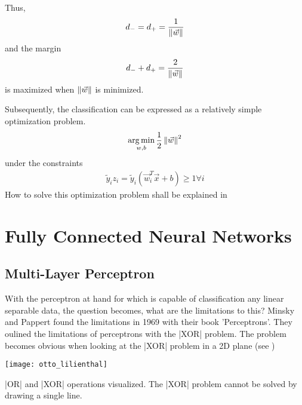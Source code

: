 Thus,
\begin{align}
    d_- = d_+ = \frac{1}{\left\lVert\vec{w}\right\rVert}
\end{align}
and the margin
\begin{align}
    d_- + d_+ = \frac{2}{\left\lVert\vec{w}\right\rVert}
\end{align}
is maximized when $\left\lVert\vec{w}\right\rVert$ is minimized.

Subsequently, the classification can be expressed as a relatively simple optimization problem.
\begin{align}
    \operatorname*{arg\,min}_{w, b} \frac{1}{2} \left\lVert\vec{w}\right\rVert^2
\end{align}
under the constraints
\begin{align}
    \tilde{y}_i z_i = \tilde{y}_i (\vec{w}_i^T \vec{x} + b) \geq 1 \forall i
\end{align}
How to solve this optimization problem shall be explained in 













\section[Fully Connected NNs]{Fully Connected Neural Networks}
\subsection{Multi-Layer Perceptron}
With the perceptron at hand for which is capable of classification any linear separable data, the question becomes, what are the limitations to this?
Minsky and Pappert found the limitations in 1969 with their book 'Perceptrons'.
They oulined the limitations of perceptrons with the |XOR| problem.
The problem becomes obvious when looking at the |XOR| problem in a 2D plane (see )
\begin{marginfigure}
    \texttt{[image: otto\_lilienthal]}
    \caption[]{|OR| and |XOR| operations visualized. The |XOR| problem cannot be solved by drawing a single line.}
\end{marginfigure}

